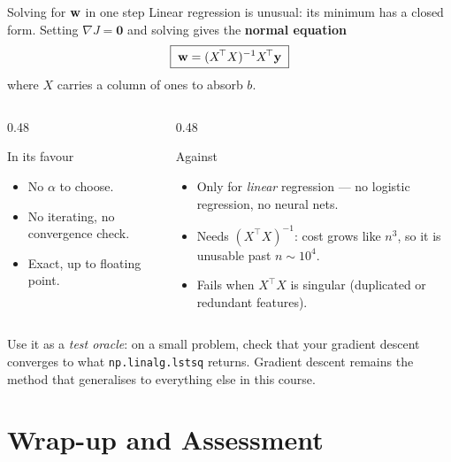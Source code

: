 \documentclass[aspectratio=169,10pt]{beamer}
\begin{document}
\begin{frame}{Solving for $\mathbf{w}$ in one step}
  \footnotesize
  Linear regression is unusual: its minimum has a closed form. Setting $\nabla J=\mathbf{0}$
  and solving gives the \textbf{normal equation}
  \[
    \boxed{\;\mathbf{w} = (X^{\!\top}X)^{-1}X^{\!\top}\mathbf{y}\;}
  \]
  where $X$ carries a column of ones to absorb $b$.
  \begin{columns}[T,onlytextwidth]
    \begin{column}{0.48\textwidth}
      \begin{block}{In its favour}
        \begin{itemize}
          \item No $\alpha$ to choose.
          \item No iterating, no convergence check.
          \item Exact, up to floating point.
        \end{itemize}
      \end{block}
    \end{column}
    \begin{column}{0.48\textwidth}
      \begin{alertblock}{Against}
        \begin{itemize}
          \item Only for \emph{linear} regression --- no logistic regression, no neural nets.
          \item Needs $(X^{\!\top}X)^{-1}$: cost grows like $n^3$, so it is unusable past
                $n\sim10^4$.
          \item Fails when $X^{\!\top}X$ is singular (duplicated or redundant features).
        \end{itemize}
      \end{alertblock}
    \end{column}
  \end{columns}
  \begin{keyidea}
    Use it as a \emph{test oracle}: on a small problem, check that your gradient descent
    converges to what \texttt{np.linalg.lstsq} returns. Gradient descent remains the method
    that generalises to everything else in this course.
  \end{keyidea}
\end{frame}

\section{Wrap-up and Assessment}
\end{document}
